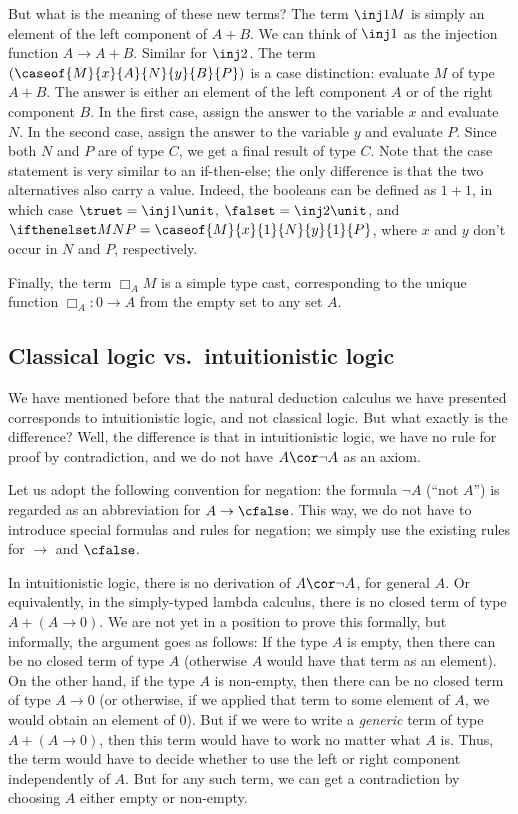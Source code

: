 \documentclass[12pt]{article}
\begin{document}
But what is the meaning of these new terms? The term $\inj1 M$ is
simply an element of the left component of $A+B$. We can think of
$\inj1$ as the injection function $A\to A+B$. Similar for $\inj2$.
The term $(\caseof{M}{x}{A}{N}{y}{B}{P})$ is a case distinction:
evaluate $M$ of type $A+B$. The answer is either an element of the
left component $A$ or of the right component $B$. In the first case,
assign the answer to the variable $x$ and evaluate $N$. In the second
case, assign the answer to the variable $y$ and evaluate $P$. Since
both $N$ and $P$ are of type $C$, we get a final result of type $C$.
Note that the case statement is very similar to an if-then-else; the
only difference is that the two alternatives also carry a value.
Indeed, the booleans can be defined as $1+1$, in which case
$\truet=\inj1\unit$, $\falset=\inj2\unit$, and $\ifthenelset
MNP=\caseof{M}{x}{1}{N}{y}{1}{P}$, where $x$ and $y$ don't occur in
$N$ and $P$, respectively.

Finally, the term $\Box_A M$ is a simple type cast, corresponding to
the unique function $\Box_A:0\to A$ from the empty set to any set $A$.

\subsection{Classical logic vs.\ intuitionistic logic}

We have mentioned before that the natural deduction calculus we have
presented corresponds to intuitionistic logic, and not classical
logic. But what exactly is the difference? Well, the difference is
that in intuitionistic logic, we have no rule for proof by
contradiction, and we do not have $A\cor\neg A$ as an axiom. 

Let us adopt the following convention for negation: the formula $\neg
A$ (``not $A$'') is regarded as an abbreviation for $A\to\cfalse$.
This way, we do not have to introduce special formulas and rules for
negation; we simply use the existing rules for $\to$ and $\cfalse$.

In intuitionistic logic, there is no derivation of $A\cor\neg A$, for
general $A$. Or equivalently, in the simply-typed lambda calculus,
there is no closed term of type $A+(A\to 0)$. We are not yet in a
position to prove this formally, but informally, the argument goes as
follows: If the type $A$ is empty, then there can be no closed term of
type $A$ (otherwise $A$ would have that term as an element). On the
other hand, if the type $A$ is non-empty, then there can be no closed
term of type $A\to 0$ (or otherwise, if we applied that term to some
element of $A$, we would obtain an element of $0$). But if we were to
write a {\em generic} term of type $A+(A\to 0)$, then this term would
have to work no matter what $A$ is. Thus, the term would have to
decide whether to use the left or right component independently of
$A$. But for any such term, we can get a contradiction by choosing $A$
either empty or non-empty.
\end{document}
